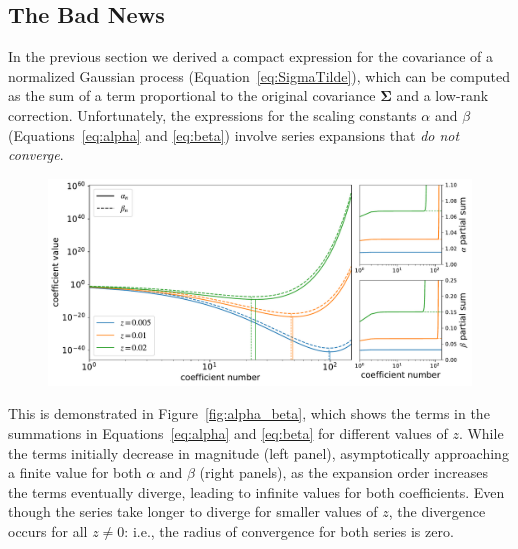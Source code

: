 \documentclass[modern]{aastex62}
\begin{document}
\subsection{The Bad News}
\label{sec:badnews}
%
In the previous section we derived a compact expression for
the covariance of a normalized Gaussian process (Equation~\ref{eq:SigmaTilde}),
which can be computed as the sum of a term proportional to the original
covariance $\pmb{\Sigma}$ and a low-rank correction.
%
Unfortunately, the expressions for the scaling constants $\alpha$ and
$\beta$ (Equations~\ref{eq:alpha} and \ref{eq:beta}) involve series
expansions that \emph{do not converge}.
%
\begin{figure}[t!]
    \begin{centering}
        \includegraphics[width=\linewidth]{figures/alpha_beta.pdf}
    \end{centering}
\end{figure}
%
This is demonstrated in Figure~\ref{fig:alpha_beta}, which shows the
terms in the summations in Equations~\ref{eq:alpha} and \ref{eq:beta} for
different values of $z$. While the terms initially decrease in magnitude
(left panel), asymptotically approaching a finite value for both
$\alpha$ and $\beta$ (right panels), as the expansion order increases
the terms eventually diverge, leading to infinite values for both
coefficients. Even though the series take longer to diverge for smaller
values of $z$, the divergence occurs for all $z \ne 0$: i.e., the radius
of convergence for both series is zero.
\end{document}

